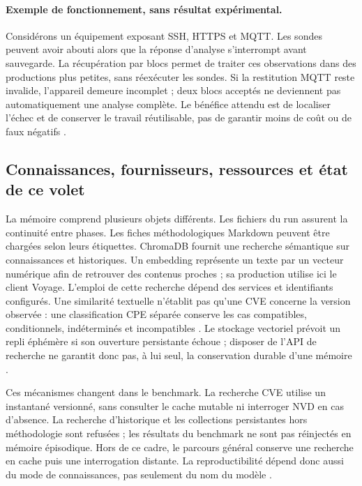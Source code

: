 \documentclass[11pt,a4paper]{article}
\begin{document}
\paragraph{Exemple de fonctionnement, sans résultat expérimental.}
Considérons un équipement exposant SSH, HTTPS et MQTT. Les sondes peuvent
avoir abouti alors que la réponse d'analyse s'interrompt avant sauvegarde.
La récupération par blocs permet de traiter ces observations dans des
productions plus petites, sans réexécuter les sondes. Si la restitution MQTT
reste invalide, l'appareil demeure incomplet ; deux blocs acceptés ne deviennent
pas automatiquement une analyse complète. Le bénéfice attendu est de
localiser l'échec et de conserver le travail réutilisable, pas de garantir
moins de coût ou de faux négatifs \cite{arch-reprise-blocs}.

\subsection{Connaissances, fournisseurs, ressources et état de ce volet}
La mémoire comprend plusieurs objets différents. Les fichiers du run assurent
la continuité entre phases. Les fiches méthodologiques Markdown peuvent être
chargées selon leurs étiquettes. ChromaDB fournit une recherche sémantique
sur connaissances et historiques. Un embedding représente un texte par un
vecteur numérique afin de retrouver des contenus proches ; sa production
utilise ici le client Voyage. L'emploi de cette recherche dépend des services et identifiants configurés. Une similarité textuelle
n'établit pas qu'une CVE concerne la version observée : une classification CPE
séparée conserve les cas compatibles, conditionnels, indéterminés et
incompatibles \cite{arch-connaissances,arch-cve}.
Le stockage vectoriel prévoit un repli éphémère si son ouverture persistante
échoue ; disposer de l'API de recherche ne garantit donc pas, à lui seul,
la conservation durable d'une mémoire \cite{arch-stockage}.

Ces mécanismes changent dans le benchmark. La recherche CVE utilise un
instantané versionné, sans consulter le cache mutable ni interroger NVD en
cas d'absence. La recherche d'historique et les collections persistantes hors
méthodologie sont refusées ; les résultats du benchmark ne sont pas réinjectés
en mémoire épisodique. Hors de ce cadre, le parcours général conserve une
recherche en cache puis une interrogation distante. La reproductibilité dépend
donc aussi du mode de connaissances, pas seulement du nom du modèle
\cite{arch-connaissances,arch-memoire,arch-executeur}.
\end{document}

